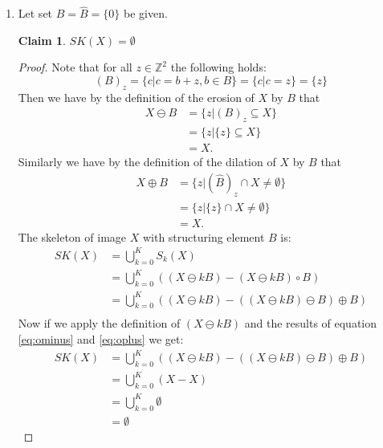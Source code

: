 \documentclass[a4paper]{article}
\newtheorem*{claim}{Claim}
\begin{document}
\begin{enumerate}
\item
Let set $B = \hat{B} = \{0\}$ be given. \\
\begin{claim}
    $SK(X) = \emptyset$
\end{claim}
\begin{proof}
Note that for all $z \in \mathbb{Z}^{2}$ the following holds:
\[
    (B)_{z} = \{c|c = b + z, b \in B\} = \{c|c = z\} = \{z\}
\]
Then we have by the definition of the erosion of $X$ by $B$ that
\begin{align} \label{eq:ominus}
    X \ominus B &= \{z | (B)_{z} \subseteq X\} \nonumber\\
                &= \{z | \{z\} \subseteq X\} \\
                &= X. \nonumber
\end{align}
Similarly we have by the definition of the dilation of $X$ by $B$ that
\begin{align} \label{eq:oplus}
    X \oplus B &= \{z | (\hat{B})_{z} \cap X \neq \emptyset\} \nonumber\\
               &= \{z | \{z\} \cap X \neq \emptyset\} \\
               &= X. \nonumber
\end{align}
The skeleton of image $X$ with structuring element $B$ is:
\begin{align*}
    SK(X) &= \bigcup_{k = 0}^K S_{k}(X) \\
          &= \bigcup_{k = 0}^K \left((X\ominus kB) - (X \ominus kB) \circ B\right) \\
          &= \bigcup_{k = 0}^K \left((X \ominus kB) - ((X \ominus kB) \ominus B) \oplus B\right) \\
\end{align*}
Now if we apply the definition of $(X \ominus kB)$ and the results of equation \ref{eq:ominus} and \ref{eq:oplus} we get:
\begin{align*}
    SK(X) &= \bigcup_{k = 0}^K \left((X \ominus kB) - ((X \ominus kB) \ominus B) \oplus B\right) \\
          &= \bigcup_{k = 0}^K \left(X - X\right) \\
          &= \bigcup_{k = 0}^K \emptyset \\
          &= \emptyset
\end{align*}
\end{proof}


\end{enumerate}
\end{document}
